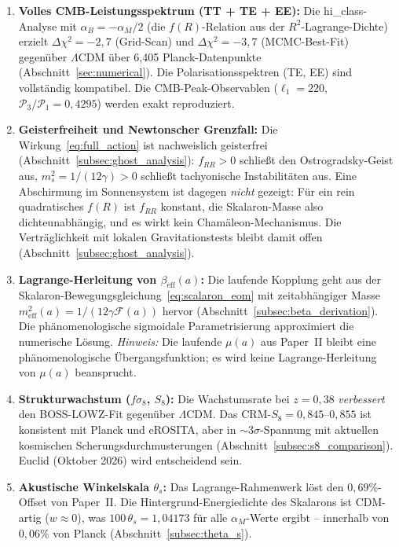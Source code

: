 \documentclass[11pt,a4paper]{article}
\begin{document}
\begin{enumerate}
\item \textbf{Volles CMB-Leistungsspektrum (TT + TE + EE):} Die hi\_class-Analyse mit $\alpha_B = -\alpha_M/2$ (die $f(R)$-Relation aus der $R^2$-Lagrange-Dichte) erzielt $\Delta\chi^2 = -2{,}7$ (Grid-Scan) und $\Delta\chi^2 = -3{,}7$ (MCMC-Best-Fit) gegen\"uber $\Lambda$CDM \"uber 6{,}405 Planck-Datenpunkte (Abschnitt~\ref{sec:numerical}). Die Polarisationsspektren (TE, EE) sind vollst\"andig kompatibel. Die CMB-Peak-Observablen ($\ell_1 = 220$, $\mathcal{P}_3/\mathcal{P}_1 = 0{,}4295$) werden exakt reproduziert.

\item \textbf{Geisterfreiheit und Newtonscher Grenzfall:} Die Wirkung~\eqref{eq:full_action} ist nachweislich geisterfrei (Abschnitt~\ref{subsec:ghost_analysis}): $f_{RR} > 0$ schlie\ss t den Ostrogradsky-Geist aus, $m_s^2 = 1/(12\gamma) > 0$ schlie\ss t tachyonische Instabilit\"aten aus. Eine Abschirmung im Sonnensystem ist dagegen \textit{nicht} gezeigt: F\"ur ein rein quadratisches $f(R)$ ist $f_{RR}$ konstant, die Skalaron-Masse also dichteunabh\"angig, und es wirkt kein Cham\"aleon-Mechanismus. Die Vertr\"aglichkeit mit lokalen Gravitationstests bleibt damit offen (Abschnitt~\ref{subsec:ghost_analysis}).

\item \textbf{Lagrange-Herleitung von $\beta_{\mathrm{eff}}(a)$:} Die laufende Kopplung geht aus der Skalaron-Bewegungsgleichung~\eqref{eq:scalaron_eom} mit zeitabh\"angiger Masse $m_{\mathrm{eff}}^2(a) = 1/(12\gamma\mathcal{F}(a))$ hervor (Abschnitt~\ref{subsec:beta_derivation}). Die ph\"anomenologische sigmoidale Parametrisierung approximiert die numerische L\"osung. \textit{Hinweis:} Die laufende $\mu(a)$ aus Paper~II bleibt eine ph\"anomenologische \"Ubergangsfunktion; es wird keine Lagrange-Herleitung von $\mu(a)$ beansprucht.

\item \textbf{Strukturwachstum ($f\sigma_8$, $S_8$):} Die Wachstumsrate bei $z = 0{,}38$ \textit{verbessert} den BOSS-LOWZ-Fit gegen\"uber $\Lambda$CDM. Das CRM-$S_8 = 0{,}845$--$0{,}855$ ist konsistent mit Planck und eROSITA, aber in $\sim 3\sigma$-Spannung mit aktuellen kosmischen Scherungsdurchmusterungen (Abschnitt~\ref{subsec:s8_comparison}). Euclid (Oktober 2026) wird entscheidend sein.

\item \textbf{Akustische Winkelskala $\theta_s$:} Das Lagrange-Rahmenwerk l\"ost den $0{,}69\%$-Offset von Paper~II. Die Hintergrund-Energiedichte des Skalarons ist CDM-artig ($w \approx 0$), was $100\,\theta_s = 1{,}04173$ f\"ur alle $\alpha_M$-Werte ergibt -- innerhalb von $0{,}06\%$ von Planck (Abschnitt~\ref{subsec:theta_s}).


\end{enumerate}
\end{document}
